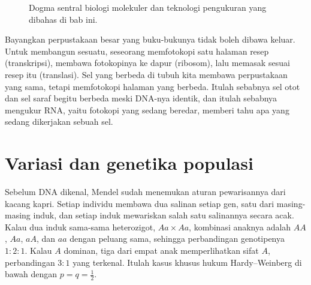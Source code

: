 \begin{figure}[ht]
\centering
{}
\caption{Dogma sentral biologi molekuler dan teknologi pengukuran yang dibahas di bab ini.}
\label{fig:dogma}
\end{figure}

Bayangkan perpustakaan besar yang buku-bukunya tidak boleh dibawa keluar. Untuk membangun sesuatu, seseorang
memfotokopi satu halaman resep (transkripsi), membawa fotokopinya ke dapur (ribosom), lalu memasak sesuai resep itu
(translasi). Sel yang berbeda di tubuh kita membawa perpustakaan yang sama, tetapi memfotokopi halaman yang berbeda.
Itulah sebabnya sel otot dan sel saraf begitu berbeda meski DNA-nya identik, dan itulah sebabnya mengukur RNA, yaitu
fotokopi yang sedang beredar, memberi tahu apa yang sedang dikerjakan sebuah sel.

\section{Variasi dan genetika populasi}

Sebelum DNA dikenal, Mendel sudah menemukan aturan pewarisannya dari kacang kapri. Setiap individu membawa dua salinan setiap
gen, satu dari masing-masing induk, dan setiap induk mewariskan salah satu salinannya secara acak. Kalau dua induk sama-sama
heterozigot, $Aa\times Aa$, kombinasi anaknya adalah $AA$, $Aa$, $aA$, dan $aa$ dengan peluang sama, sehingga perbandingan genotipenya
$1:2:1$. Kalau $A$ dominan, tiga dari empat anak memperlihatkan sifat $A$, perbandingan $3:1$ yang terkenal. Itulah kasus khusus
hukum Hardy--Weinberg di bawah dengan $p=q=\tfrac12$.

